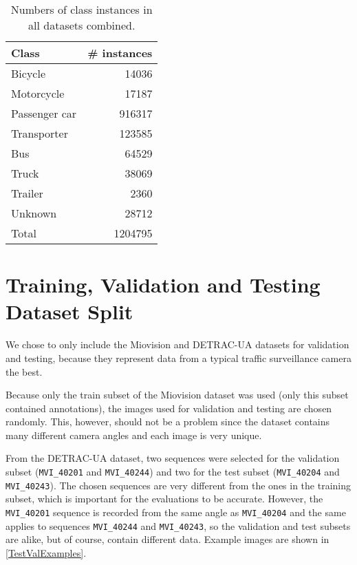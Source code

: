\begin{table}[t]
\centering
\begin{tabular}{|l|r|}
    \hline
    Class         & \# instances \\
    \hline
    Bicycle       &  \num{14036} \\
    Motorcycle    &  \num{17187} \\
    Passenger car & \num{916317} \\
    Transporter   & \num{123585} \\
    Bus           &  \num{64529} \\
    Truck         &  \num{38069} \\
    Trailer       &   \num{2360} \\
    Unknown       &  \num{28712} \\
    \hline
    \hline
    Total         & \num{1204795} \\
    \hline
\end{tabular}
\caption{Numbers of class instances in all datasets combined.}
\label{DatasetsCounts}
\end{table}


\section{Training, Validation and Testing Dataset Split}

We chose to only include the Miovision and DETRAC-UA datasets for validation and
testing, because they represent data from a typical traffic surveillance camera
the best. 

Because only the train subset of the Miovision dataset was used (only this
subset contained annotations), the images used for validation and testing are
chosen randomly. This, however, should not be a problem since the dataset
contains many different camera angles and each image is very unique.

From the DETRAC-UA dataset, two sequences were selected for the validation
subset (\texttt{MVI\_40201} and \texttt{MVI\_40244}) and two for the test subset
(\texttt{MVI\_40204} and \texttt{MVI\_40243}). The chosen sequences are very
different from the ones in the training subset, which is important for the
evaluations to be accurate. However, the \texttt{MVI\_40201} sequence is
recorded from the same angle as \texttt{MVI\_40204} and the same applies to
sequences \texttt{MVI\_40244} and \texttt{MVI\_40243}, so the validation and
test subsets are alike, but of course, contain different data. Example images
are shown in \autoref{TestValExamples}.

